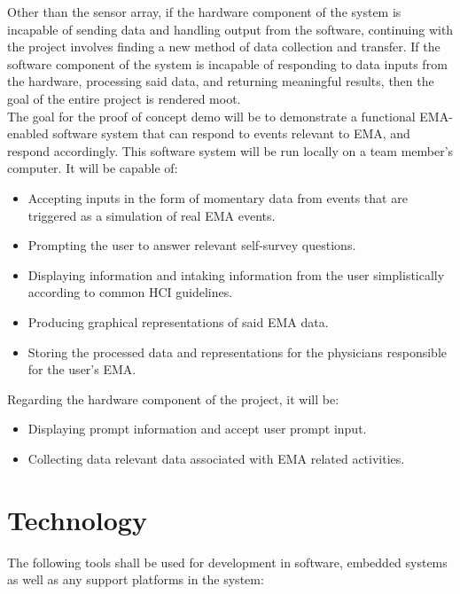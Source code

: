 \documentclass[12pt]{article}
\begin{document}
Other than the sensor array, if the hardware component of the system is incapable of sending data and handling output from the software, continuing with the project involves finding a new method of data collection and transfer. If the software component of the system is incapable of responding to data inputs from the hardware, processing said data, and returning meaningful results, then the goal of the entire project is rendered moot.\\

The goal for the proof of concept demo will be to demonstrate a functional EMA-enabled software system that can respond to events relevant to EMA, and respond accordingly. This software system will be run locally on a team member's computer. It will be capable of:\\

\begin{itemize}
\item Accepting inputs in the form of momentary data from events that are triggered as a simulation of real EMA events.
\item Prompting the user to answer relevant self-survey questions.
\item Displaying information and intaking information from the user simplistically according to common HCI guidelines.
\item Producing graphical representations of said EMA data.
\item Storing the processed data and representations for the physicians responsible for the user's EMA.
\end{itemize}

Regarding the hardware component of the project, it will be:\\

\begin{itemize}
\item Displaying prompt information and accept user prompt input.
\item Collecting data relevant data associated with EMA related activities.
\end{itemize}

\section{Technology}
The following tools shall be used for development in software, embedded systems as well as any support platforms in the system:
\end{document}
